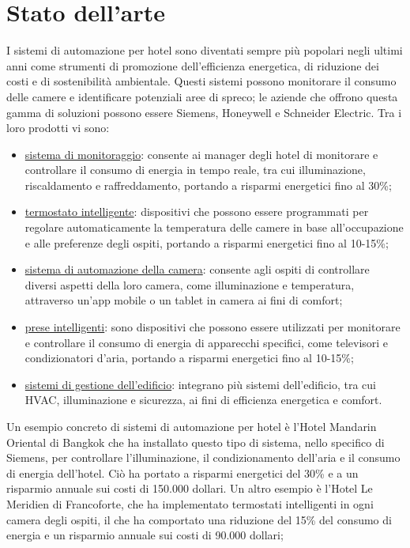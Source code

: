 
\section{Stato dell'arte}

I sistemi di automazione per hotel sono diventati sempre più popolari negli ultimi anni come strumenti di promozione dell'efficienza energetica, di riduzione dei costi e di sostenibilità ambientale. Questi sistemi possono monitorare il consumo delle camere e identificare potenziali aree di spreco; le aziende che offrono questa gamma di soluzioni possono essere Siemens, Honeywell e Schneider Electric. Tra i loro prodotti vi sono:

\begin{itemize}
    \item \underline{sistema di monitoraggio}: consente ai manager degli hotel di monitorare e controllare il consumo di energia in tempo reale, tra cui illuminazione, riscaldamento e raffreddamento, portando a risparmi energetici fino al 30\%;
    \item \underline{termostato intelligente}: dispositivi che possono essere programmati per regolare automaticamente la temperatura delle camere in base all'occupazione e alle preferenze degli ospiti, portando a risparmi energetici fino al 10-15\%;
    \item \underline{sistema di automazione della camera}: consente agli ospiti di controllare diversi aspetti della loro camera, come illuminazione e temperatura, attraverso un'app mobile o un tablet in camera ai fini di comfort;
    \item \underline{prese intelligenti}: sono dispositivi che possono essere utilizzati per monitorare e controllare il consumo di energia di apparecchi specifici, come televisori e condizionatori d'aria, portando a risparmi energetici fino al 10-15\%;
    \item \underline{sistemi di gestione dell'edificio}: integrano più sistemi dell'edificio, tra cui HVAC, illuminazione e sicurezza, ai fini di efficienza energetica e comfort.
\end{itemize}

Un esempio concreto di sistemi di automazione per hotel è l'Hotel Mandarin Oriental di Bangkok che ha installato questo tipo di sistema, nello specifico di Siemens, per controllare l'illuminazione, il condizionamento dell'aria e il consumo di energia dell'hotel. Ciò ha portato a risparmi energetici del 30\% e a un risparmio annuale sui costi di 150.000 dollari. Un altro esempio è l'Hotel Le Meridien di Francoforte, che ha implementato termostati intelligenti in ogni camera degli ospiti, il che ha comportato una riduzione del 15\% del consumo di energia e un risparmio annuale sui costi di 90.000 dollari;

